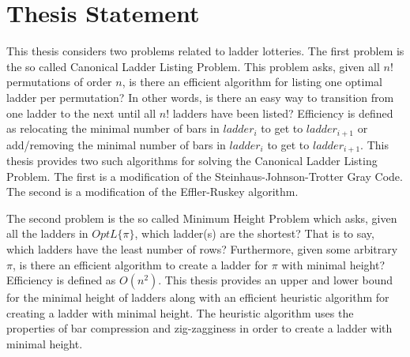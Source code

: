 \section{Thesis Statement}
  	This thesis considers two problems related 
    to ladder lotteries. The first problem is the so called Canonical Ladder Listing Problem. 
	This problem asks, given all $n!$ permutations of order $n$, is there an efficient algorithm for listing 
	one optimal ladder per permutation? In other words, 
	is there an easy way to transition from one ladder to the next until all $n!$ ladders 
	have been listed? Efficiency is defined as relocating the minimal number of bars in $ladder_{i}$ 
	to get to $ladder_{i+1}$ or add/removing the minimal number of bars in $ladder_{i}$
	to get to $ladder_{i+1}$. This thesis provides two such algorithms for solving the Canonical
	Ladder Listing Problem. The first is a modification of the Steinhaus-Johnson-Trotter Gray Code. The second 
	is a modification of the Effler-Ruskey algorithm.\par  
	The second problem is the so called Minimum Height 
    Problem which asks, given all the ladders in $OptL\{\pi\}$, which ladder(s) are 
    the shortest? That is to say, which ladders have the least number of rows? Furthermore, given some arbitrary $\pi$, 
	is there an efficient algorithm to create a ladder for $\pi$ with minimal height? Efficiency is defined as 
	$O(n^{2})$. This thesis provides an upper and lower bound for the minimal height of ladders along with an efficient heuristic algorithm 
	for creating a ladder with minimal height. The heuristic algorithm uses the properties of bar compression and zig-zagginess 
	in order to create a ladder with minimal height.
	
